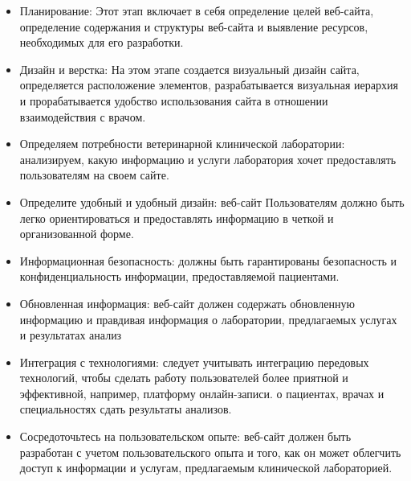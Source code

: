 \begin{itemize}
		\item Планирование: Этот этап включает в себя определение целей веб-сайта, определение содержания и структуры веб-сайта и выявление ресурсов, необходимых для его разработки.
	
	\item Дизайн и верстка: На этом этапе создается визуальный дизайн сайта, определяется расположение элементов, разрабатывается визуальная иерархия и прорабатывается удобство использования сайта в отношении взаимодействия с врачом. 
		
	\item Определяем потребности ветеринарной клинической лаборатории: анализируем, какую информацию и услуги лаборатория хочет предоставлять пользователям на своем сайте.
	
	\item Определите удобный и удобный дизайн: веб-сайт
	Пользователям должно быть легко ориентироваться и предоставлять информацию в четкой и организованной форме.

	\item Информационная безопасность: должны быть гарантированы безопасность и конфиденциальность информации, предоставляемой пациентами.

	\item Обновленная информация: веб-сайт должен содержать обновленную информацию и
	правдивая информация о лаборатории, предлагаемых услугах и результатах
	анализ

	\item  Интеграция с технологиями: следует учитывать интеграцию передовых технологий, чтобы сделать работу пользователей более приятной и эффективной, например, платформу онлайн-записи.
	о пациентах, врачах и специальностях сдать результаты анализов.

	\item  Сосредоточьтесь на пользовательском опыте: веб-сайт должен быть разработан
	с учетом пользовательского опыта и того, как он может облегчить доступ к информации и услугам, предлагаемым клинической лабораторией.
\end{itemize}